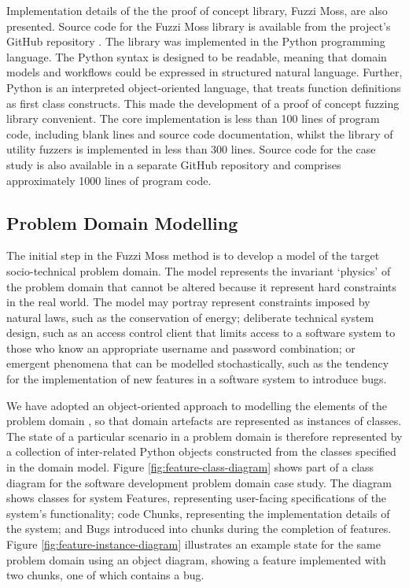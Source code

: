 \documentclass{sig-alternate}
\begin{document}
Implementation details of the the proof of concept library, Fuzzi Moss, are also
presented.  Source code for the Fuzzi Moss library is available from the
project's GitHub repository \citep{wallis2016fuzzi-moss-scm}.  The library was
implemented in the Python programming language.  The Python syntax is designed
to be readable, meaning that domain models and workflows could be expressed in
structured natural language.  Further, Python is an interpreted object-oriented
language, that treats function definitions as first class constructs.  This made
the development of a proof of concept fuzzing library convenient.  The core
implementation is less than 100 lines of program code, including blank lines and
source code documentation, whilst the library of utility fuzzers is implemented
in less than 300 lines. Source code for the case study is also available in a
separate GitHub repository \citep{storer2016softdev-workflow-scm} and comprises
approximately 1000 lines of program code.


\subsection{Problem Domain Modelling}


The initial step in the Fuzzi Moss method is to develop a model of the target
socio-technical problem domain.  The model represents the invariant `physics' of
the problem domain that cannot be altered because it represent hard constraints
in the real world.  The model may portray represent constraints imposed by
natural laws, such as the conservation of energy; deliberate technical system
design, such as an access control client that limits access to a software system
to those who know an appropriate username and password combination; or emergent
phenomena that can be modelled stochastically, such as the tendency for the
implementation of new features in a software system to introduce bugs.

We have adopted an object-oriented approach to modelling the elements of the
problem domain \citep{bennett06object}, so that domain artefacts are represented
as instances of classes.  The state of a particular scenario in a problem domain
is therefore represented by a collection of inter-related Python objects
constructed from the classes specified in the domain model.  Figure
\ref{fig:feature-class-diagram} shows part of a class diagram for the software
development problem domain case study.  The diagram shows classes for system
Features, representing user-facing specifications of the system's functionality;
code Chunks, representing the implementation details of the system; and Bugs
introduced into chunks during the completion of features.  Figure
\ref{fig:feature-instance-diagram} illustrates an example state for the same
problem domain using an object diagram, showing a feature implemented with two
chunks, one of which contains a bug.
\end{document}
